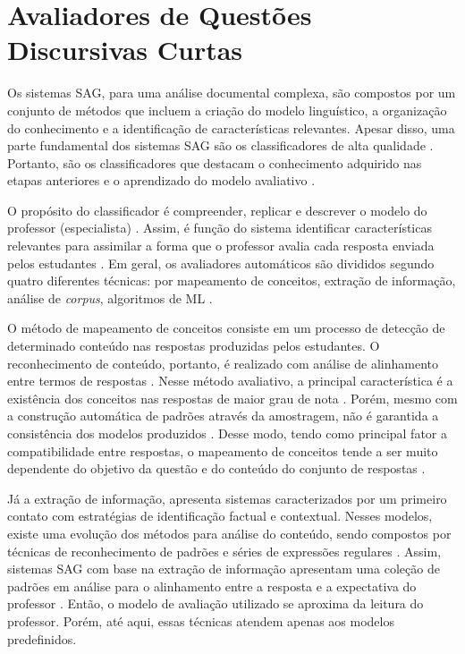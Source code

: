 \section{Avaliadores de Questões Discursivas Curtas}

Os sistemas SAG, para uma análise documental complexa, são compostos por um conjunto de métodos que incluem a criação do modelo linguístico, a organização do conhecimento e a identificação de características relevantes. Apesar disso, uma parte fundamental dos sistemas SAG são os classificadores de alta qualidade \cite{funayama2020}. Portanto, são os classificadores que destacam o conhecimento adquirido nas etapas anteriores e o aprendizado do modelo avaliativo \cite{mohler2011}.

O propósito do classificador é compreender, replicar e descrever o modelo do professor (especialista) \cite{yang2021}. Assim, é função do sistema identificar características relevantes para assimilar a forma que o professor avalia cada resposta enviada pelos estudantes \cite{jordan2012, mao2018}. Em geral, os avaliadores automáticos são divididos segundo quatro diferentes técnicas: por mapeamento de conceitos, extração de informação, análise de \textit{corpus}, algoritmos de ML \cite{burrows2015}. 

O método de mapeamento de conceitos consiste em um processo de detecção de determinado conteúdo nas respostas produzidas pelos estudantes. O reconhecimento de conteúdo, portanto, é realizado com análise de alinhamento entre termos de respostas \cite{jimenez2013, zhang2020}. Nesse método avaliativo, a principal característica é a existência dos conceitos nas respostas de maior grau de nota \cite{kar2017, chakraborty2017}. Porém, mesmo com a construção automática de padrões através da amostragem, não é garantida a consistência dos modelos produzidos \cite{azad2020}. Desse modo, tendo como principal fator a compatibilidade entre respostas, o mapeamento de conceitos tende a ser muito dependente do objetivo da questão e do conteúdo do conjunto de respostas \cite{filighera2020}.

Já a extração de informação, apresenta sistemas caracterizados por um primeiro contato com estratégias de identificação factual e contextual. Nesses modelos, existe uma evolução dos métodos para análise do conteúdo, sendo compostos por técnicas de reconhecimento de padrões e séries de expressões regulares \cite{ramachandran2015b, butcher2010}. Assim, sistemas SAG com base na extração de informação apresentam uma coleção de padrões em análise para o alinhamento entre a resposta e a expectativa do professor \cite{tan2020}. Então, o modelo de avaliação utilizado se aproxima da leitura do professor. Porém, até aqui, essas técnicas atendem apenas aos modelos predefinidos.

